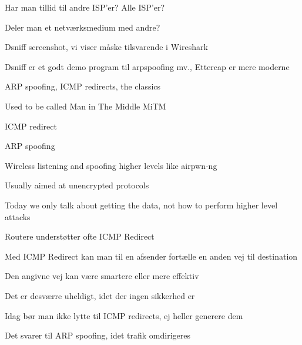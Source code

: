\documentclass[Screen16to9,17pt]{foils}
\begin{document}

\begin{list1}
\item Har man tillid til andre ISP'er? Alle ISP'er?
\item Deler man et netværksmedium med andre?
\end{list1}





\centerline{Dsniff screenshot, vi viser måske tilsvarende i Wireshark}

Dsniff er et godt demo program til arpspoofing mv., Ettercap er mere moderne




\begin{list1}
\item ARP spoofing, ICMP redirects, the classics
\item Used to be called Man in The Middle MiTM
\begin{list2}
\item ICMP redirect
\item ARP spoofing
\item Wireless listening and spoofing higher levels like  airpwn-ng 
\end{list2}
\item Usually aimed at unencrypted protocols
\item Today we only talk about getting the data, not how to perform higher level attacks
\end{list1}



\begin{list1}
\item Routere understøtter ofte ICMP Redirect
\item Med ICMP Redirect kan man til en afsender fortælle en anden vej til destination
\item Den angivne vej kan være smartere eller mere effektiv
\item Det er desværre uheldigt, idet der ingen sikkerhed er
\item Idag bør man ikke lytte til ICMP redirects, ej heller generere dem
\item Det svarer til ARP spoofing, idet trafik omdirigeres
\end{list1}
\end{document}

